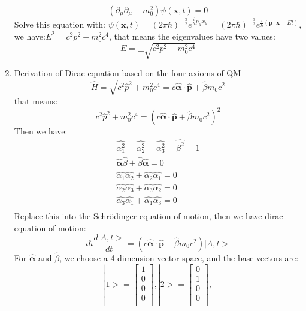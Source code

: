 \documentclass[12pt]{article}
\numberwithin{equation}{section}
\begin{document}
\begin{enumerate}
	\begin{equation}(\partial_{\mu}\partial_{\mu}-m^2_0)\psi(\mathbf{x},t)=0\end{equation}
	Solve this equation with: 
	$\psi(\mathbf{x},t)=(2\pi\hbar)^{-\frac{3}{2}}e^{\frac{i}{\hbar} p_\mu x_\mu}=
	(2\pi\hbar)^{-\frac{3}{2}}e^{\frac{i}{\hbar} (\mathbf{p}\cdot\mathbf{x}-Et)}$, 
	we have:$E^2=c^2p^2+m_0^2c^4$, that means the eigenvalues have two values:
	\begin{equation}E=\pm\sqrt{c^2p^2+m_0^2c^4}\end{equation}
\item Derivation of Dirac equation based on the four axioms of QM
	\begin{equation}\hat{H}=\sqrt{c^2\hat{p}^2+m_0^2c^4}
	=c\hat{\mathbf{\alpha}}\cdot\hat{\mathbf{p}}+\hat{\beta} m_0c^2\end{equation}
	that means:
	\begin{equation} c^2\hat{p}^2+m_0^2c^4
	=(c\hat{\mathbf{\alpha}}\cdot\hat{\mathbf{p}}+\hat{\beta} m_0c^2)^2\end{equation}
	Then we have:
	\begin{equation}\begin{split}
	\hat{\alpha_1^2}=\hat{\alpha_2^2}=\hat{\alpha_3^2}=\hat{\beta^2}=1 \\
	\hat{\mathbf{\alpha}}\hat{\beta}+\hat{\beta}\hat{\mathbf{\alpha}}=0 \\
	\hat{\alpha_1}\hat{\alpha_2}+\hat{\alpha_2}\hat{\alpha_1}=0 \\
	\hat{\alpha_2}\hat{\alpha_3}+\hat{\alpha_3}\hat{\alpha_2}=0 \\
	\hat{\alpha_3}\hat{\alpha_1}+\hat{\alpha_1}\hat{\alpha_3}=0 \\
	\end{split}\end{equation}
	Replace this into the Schr\"{o}dinger equation of motion, then we have dirac equation of motion:
	\begin{equation}i\hbar\frac{d|A,t>}{dt}=
	(c\hat{\mathbf{\alpha}}\cdot\hat{\mathbf{p}}+\hat{\beta} m_0c^2)|A,t>\end{equation}
	For $\hat{\mathbf{\alpha}}$ and $\hat{\beta}$, we choose a 4-dimension vector space, and the base vectors are:
	\[|1>=\begin{bmatrix}1\\ 0\\ 0\\ 0\\\end{bmatrix}, |2>=\begin{bmatrix}0\\ 1\\ 0\\ 0\\\end{bmatrix},
\]
\end{enumerate}
\end{document}
